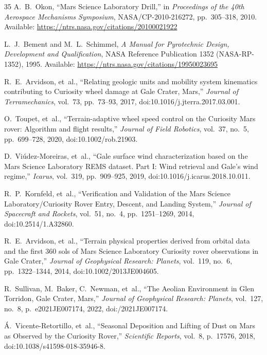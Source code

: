 \documentclass[11pt,a4paper]{article}
\begin{document}
\begin{thebibliography}{35}
	A.~B.~Okon, ``Mars Science Laboratory Drill,'' in \textit{Proceedings of the 40th Aerospace Mechanisms Symposium}, NASA/CP-2010-216272, pp.~305--318, 2010. Available: \url{https://ntrs.nasa.gov/citations/20100021922}

	L.~J.~Bement and M.~L.~Schimmel, \textit{A Manual for Pyrotechnic Design, Development and Qualification}, NASA Reference Publication 1352 (NASA-RP-1352), 1995. Available: \url{https://ntrs.nasa.gov/citations/19950023695}

	R.~E.~Arvidson, et~al., ``Relating geologic units and mobility system kinematics contributing to Curiosity wheel damage at Gale Crater, Mars,'' \textit{Journal of Terramechanics}, vol.~73, pp.~73--93, 2017, doi:10.1016/j.jterra.2017.03.001.

	O.~Toupet, et~al., ``Terrain-adaptive wheel speed control on the Curiosity Mars rover: Algorithm and flight results,'' \textit{Journal of Field Robotics}, vol.~37, no.~5, pp.~699--728, 2020, doi:10.1002/rob.21903.

	D.~Vi\'{u}dez-Moreiras, et~al., ``Gale surface wind characterization based on the Mars Science Laboratory REMS dataset. Part I: Wind retrieval and Gale's wind regime,'' \textit{Icarus}, vol.~319, pp.~909--925, 2019, doi:10.1016/j.icarus.2018.10.011.

	R.~P.~Kornfeld, et~al., ``Verification and Validation of the Mars Science Laboratory/Curiosity Rover Entry, Descent, and Landing System,'' \textit{Journal of Spacecraft and Rockets}, vol.~51, no.~4, pp.~1251--1269, 2014, doi:10.2514/1.A32860.

	R.~E.~Arvidson, et~al., ``Terrain physical properties derived from orbital data and the first 360 sols of Mars Science Laboratory Curiosity rover observations in Gale Crater,'' \textit{Journal of Geophysical Research: Planets}, vol.~119, no.~6, pp.~1322--1344, 2014, doi:10.1002/2013JE004605.

	R.~Sullivan, M.~Baker, C.~Newman, et~al., ``The Aeolian Environment in Glen Torridon, Gale Crater, Mars,'' \textit{Journal of Geophysical Research: Planets}, vol.~127, no.~8, p.~e2021JE007174, 2022, doi:/\allowbreak 2021JE007174.

	\'{A}.~Vicente-Retortillo, et~al., ``Seasonal Deposition and Lifting of Dust on Mars as Observed by the Curiosity Rover,'' \textit{Scientific Reports}, vol.~8, p.~17576, 2018, doi:10.1038/s41598-018-35946-8.


\end{thebibliography}
\end{document}
